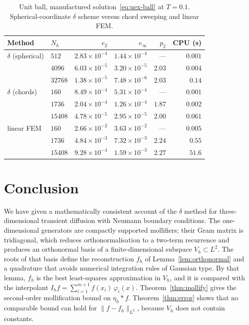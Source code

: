 \documentclass[final,3p,times]{elsarticle}
\theoremstyle{plain}
\theoremstyle{definition}
\theoremstyle{remark}
\newcommand{\dziti}{\ensuremath{\delta}\text{-Ziti}}
\begin{document}
\begin{table}[htbp]
\centering
\caption{Unit ball, manufactured solution~\eqref{eq:uex-ball} at $T=0.1$.
Spherical-coordinate \dziti{} scheme versus chord sweeping and linear FEM.}
\label{tab:ball}
\begin{tabular}{llrrrr}
\toprule
Method & $N_h$ & $e_2$ & $e_\infty$ & $p_2$ & CPU (s) \\
\midrule
\dziti{} (spherical) & $512$   & $2.83\times 10^{-4}$ & $1.44\times 10^{-4}$ & ---   & $0.001$ \\
                     & $4096$  & $6.03\times 10^{-5}$ & $3.20\times 10^{-5}$ & $2.03$ & $0.004$ \\
                     & $32768$ & $1.38\times 10^{-5}$ & $7.48\times 10^{-6}$ & $2.03$ & $0.14$ \\
\addlinespace
\dziti{} (chords)    & $160$   & $8.49\times 10^{-4}$ & $5.31\times 10^{-4}$ & ---   & $0.001$ \\
                     & $1736$  & $2.04\times 10^{-4}$ & $1.26\times 10^{-4}$ & $1.87$ & $0.002$ \\
                     & $15408$ & $4.78\times 10^{-5}$ & $2.95\times 10^{-5}$ & $2.00$ & $0.061$ \\
\addlinespace
linear FEM           & $160$   & $2.66\times 10^{-2}$ & $3.63\times 10^{-2}$ & ---   & $0.005$ \\
                     & $1736$  & $4.84\times 10^{-3}$ & $7.32\times 10^{-3}$ & $2.24$ & $0.55$ \\
                     & $15408$ & $9.28\times 10^{-4}$ & $1.59\times 10^{-3}$ & $2.27$ & $51.6$ \\
\bottomrule
\end{tabular}
\end{table}

\section{Conclusion}
\label{sec:concl}

We have given a mathematically consistent account of the \dziti{} method for
three-dimensional transient diffusion with Neumann boundary conditions. The
one-dimensional generators are compactly supported mollifiers; their Gram
matrix is tridiagonal, which reduces orthonormalisation to a two-term
recurrence and produces an orthonormal basis of a finite-dimensional subspace
$V_h\subset L^2$. The roots of that basis define the reconstruction $f_h$
of Lemma~\ref{lem:orthonormal} and a quadrature that avoids numerical
integration rules of Gaussian type. By that lemma, $f_h$ is the best
least-squares approximation in $V_h$, and it is compared with the interpolant
$I_h f=\sum_{i=1}^{m+1}f(x_i)\,\varphi_i(x)$. Theorem~\ref{thm:mollify} gives
the second-order mollification bound on $\eta_h*f$. Theorem~\ref{thm:error}
shows that no comparable bound can hold for $\lVert f-f_h\rVert_{L^2}$, because
$V_h$ does not contain constants.
\end{document}
